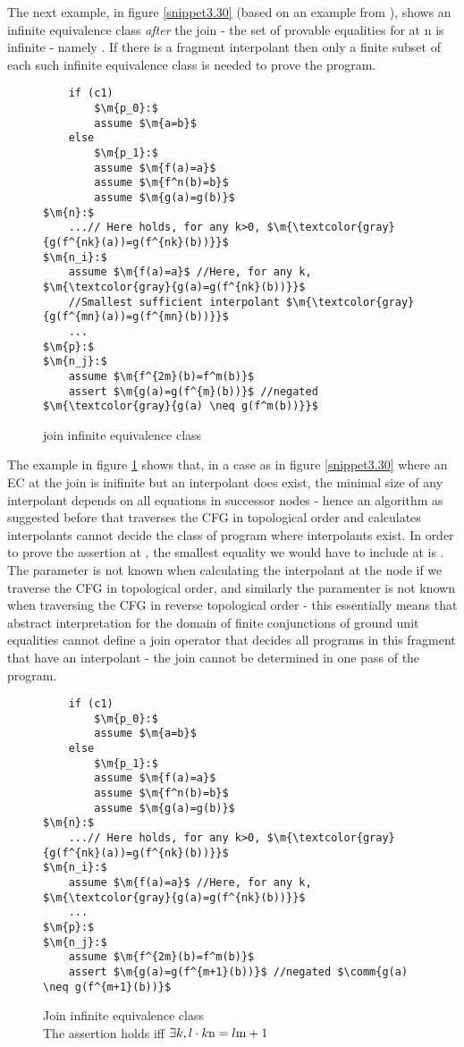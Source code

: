 The next example, in figure \ref{snippet3.30} (based on an example from \cite{GulwaniTiwariNecula04}), shows an infinite equivalence class \emph{after} the join - the set of provable equalities for  at n is infinite - namely . If there is a fragment interpolant then only a finite subset of each such infinite equivalence class is needed to prove the program.

\begin{figure}
\begin{lstlisting}
	if (c1)
		$\m{p_0}:$ 
		assume $\m{a=b}$
	else
		$\m{p_1}:$
		assume $\m{f(a)=a}$
		assume $\m{f^n(b)=b}$
		assume $\m{g(a)=g(b)}$
$\m{n}:$
	...// Here holds, for any k>0, $\m{\textcolor{gray}{g(f^{nk}(a))=g(f^{nk}(b))}}$
$\m{n_i}:$
	assume $\m{f(a)=a}$ //Here, for any k, $\m{\textcolor{gray}{g(a)=g(f^{nk}(b))}}$	
	//Smallest sufficient interpolant $\m{\textcolor{gray}{g(f^{mn}(a))=g(f^{mn}(b))}}$
	...
$\m{p}:$
$\m{n_j}:$
	assume $\m{f^{2m}(b)=f^m(b)}$ 
	assert $\m{g(a)=g(f^{m}(b))}$ //negated $\m{\textcolor{gray}{g(a) \neq g(f^m(b))}}$
\end{lstlisting}
\caption{join infinite equivalence class}
\label{snippet3.30a}
\end{figure}

The example in figure \ref{snippet3.30a} shows that, in a case as in figure \ref{snippet3.30} where an EC at the join is inifinite but an interpolant does exist, the minimal size of any interpolant depends on all equations in successor nodes - hence an algorithm as suggested before that traverses the CFG in topological order and calculates interpolants cannot decide the class of program where interpolants exist.
In order to prove the assertion at , the smallest equality we would have to include at  is .
The parameter  is not known when calculating the interpolant at the node  if we traverse the CFG in topological order,
and similarly the paramenter  is not known when traversing the CFG in reverse topological order - this essentially means that abstract interpretation for the domain of finite conjunctions of ground unit equalities cannot define a join operator that decides all programs in this fragment that have an interpolant - the join cannot be determined in one pass of the program.

\begin{figure}
\begin{lstlisting}
	if (c1)
		$\m{p_0}:$ 
		assume $\m{a=b}$
	else
		$\m{p_1}:$
		assume $\m{f(a)=a}$
		assume $\m{f^n(b)=b}$
		assume $\m{g(a)=g(b)}$
$\m{n}:$
	...// Here holds, for any k>0, $\m{\textcolor{gray}{g(f^{nk}(a))=g(f^{nk}(b))}}$
$\m{n_i}:$
	assume $\m{f(a)=a}$ //Here, for any k, $\m{\textcolor{gray}{g(a)=g(f^{nk}(b))}}$	
	...
$\m{p}:$
$\m{n_j}:$
	assume $\m{f^{2m}(b)=f^m(b)}$ 
	assert $\m{g(a)=g(f^{m+1}(b))}$ //negated $\comm{g(a) \neq g(f^{m+1}(b))}$
\end{lstlisting}
\caption{Join infinite equivalence class\\
The assertion holds iff $\exists k,l \cdot k\mathrm{n}=l\mathrm{m}+1$}
\label{snippet3.30b}
\end{figure}

